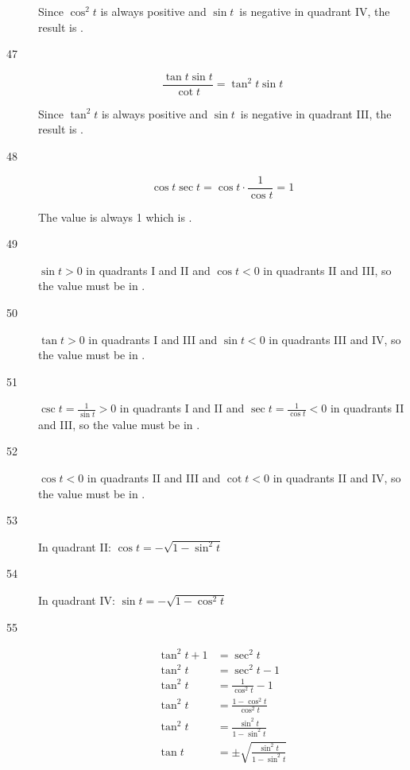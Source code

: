 \documentclass{exam}
\begin{document}
\begin{description}
        Since $\cos^2 t$ is always positive and $\sin t$ is negative in quadrant IV, the result is .

      \item[47]
        \[
          \frac{\tan t \sin t}{\cot t} = \tan^2 t \sin t
        \]

        Since $\tan^2 t$ is always positive and $\sin t$ is negative in quadrant III, the result is .

      \item[48]
        \[
          \cos t \sec t = \cos t \cdot \frac{1}{\cos t} = 1
        \]

        The value is always 1 which is .

      \item[49] $\sin t > 0$ in quadrants I and II and $\cos t < 0$ in quadrants II and III, so the value must be in
        .

      \item[50] $\tan t > 0$ in quadrants I and III and $\sin t < 0$ in quadrants III and IV, so the value must be in
        .

      \item[51] $\csc t = \frac{1}{\sin t} > 0$ in quadrants I and II and $\sec t = \frac{1}{\cos t} < 0$ in quadrants
        II and III, so the value must be in .

      \item[52] $\cos t < 0$ in quadrants II and III and $\cot t < 0$ in quadrants II and IV, so the value must be in
        .

      \item[53] In quadrant II: $\cos t = \boxed{ - \sqrt{1 - \sin^2 t} }$

      \item[54] In quadrant IV: $\sin t = \boxed{ - \sqrt{1 - \cos^2 t} }$

      \item[55] 
        \begin{align*}
          \tan^2 t + 1 & = \sec^2 t \\
          \tan^2 t     & = \sec^2 t - 1 \\
          \tan^2 t     & = \frac{1}{\cos^2 t} - 1 \\
          \tan^2 t     & = \frac{1 - \cos^2 t}{\cos^2 t} \\
          \tan^2 t     & = \frac{\sin^2 t}{1 - \sin^2 t} \\
          \tan t       & = \pm \sqrt{ \frac{\sin^2 t}{1 - \sin^2 t} } \\
        \end{align*}


\end{description}
\end{document}
